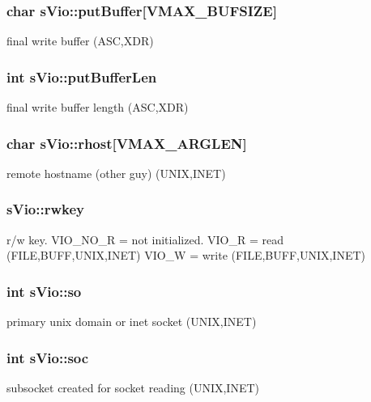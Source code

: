 \subsubsection[{put\+Buffer}]{\setlength{\rightskip}{0pt plus 5cm}char s\+Vio\+::put\+Buffer[{\bf V\+M\+A\+X\+\_\+\+B\+U\+F\+S\+I\+Z\+E}]}\label{a00002_a026eee4ab9d1413ac7dec57bcba4cff9}
final write buffer (A\+S\+C,X\+D\+R) 
\subsubsection[{put\+Buffer\+Len}]{\setlength{\rightskip}{0pt plus 5cm}int s\+Vio\+::put\+Buffer\+Len}\label{a00002_ad68b54648906734b80b93205cfb22812}
final write buffer length (A\+S\+C,X\+D\+R) 
\subsubsection[{rhost}]{\setlength{\rightskip}{0pt plus 5cm}char s\+Vio\+::rhost[{\bf V\+M\+A\+X\+\_\+\+A\+R\+G\+L\+E\+N}]}\label{a00002_af3eaf81b391a451956735215da0f6b55}
remote hostname (other guy) (U\+N\+I\+X,I\+N\+E\+T) 
\subsubsection[{rwkey}]{ s\+Vio\+::rwkey}\label{a00002_a46b6d2de5b885ef6850e74dbf69230c5}
r/w key. V\+I\+O\+\_\+\+N\+O\+\_\+\+R = not initialized. V\+I\+O\+\_\+\+R = read (F\+I\+L\+E,B\+U\+F\+F,U\+N\+I\+X,I\+N\+E\+T) V\+I\+O\+\_\+\+W = write (F\+I\+L\+E,B\+U\+F\+F,U\+N\+I\+X,I\+N\+E\+T) 
\subsubsection[{so}]{\setlength{\rightskip}{0pt plus 5cm}int s\+Vio\+::so}\label{a00002_af100e7b153d174650215657e74e0360f}
primary unix domain or inet socket (U\+N\+I\+X,I\+N\+E\+T) 
\subsubsection[{soc}]{\setlength{\rightskip}{0pt plus 5cm}int s\+Vio\+::soc}\label{a00002_a846bff280f1fad2f64708f80dd824d72}
subsocket created for socket reading (U\+N\+I\+X,I\+N\+E\+T) 
